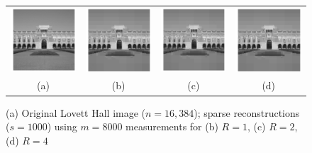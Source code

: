 \begin{figure}[t!]
	\begin{center}
		\begin{tabular}{cccc}
		\includegraphics[width=0.24\linewidth]{./fig/lovett_original.pdf} &
		\includegraphics[width=0.24\linewidth]{./fig/lovett_r1.pdf} &
		\includegraphics[width=0.24\linewidth]{./fig/lovett_r2.pdf} &
		\includegraphics[width=0.24\linewidth]{./fig/lovett_r4.pdf}  \\
		(a) & (b) & (c) & (d)
	\end{tabular}
	\end{center}
	\caption{{(a) Original Lovett Hall image ($n=16,384$); sparse reconstructions ($s=1000$) using $m=8000$ measurements for (b) $R=1$, (c) $R=2$, (d) $R=4$}}
	\label{fig:lovett}
\end{figure}

